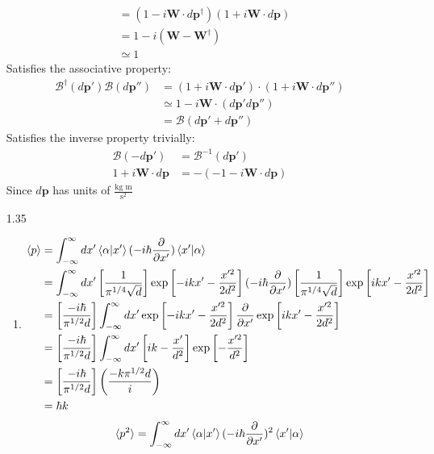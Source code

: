 \documentclass[12pt]{article}
\newcommand{\opp}{\pmb{\text{p}}}
\newcommand{\boostdag}{\mathscr{B}^{\dag}(d\opp')}
\newcommand{\opw}{\pmb{\text{W}}}
\newcommand{\p}[2]{\frac{\partial #1}{\partial #2}}
\begin{document}
\begin{enumerate}
\begin{align*}
            &=(1-i\opw\cdot d\opp^{\dagger})(1+i\opw\cdot d\opp)\\
            &=1-i(\opw-\opw^{\dagger})\\
            &\simeq 1
        \end{align*}
        Satisfies the associative property:
        \begin{align*}
            \boostdag\mathscr{B}(d\opp'')&=(1+i\opw\cdot d\opp')\cdot(1+i\opw\cdot d\opp'')\\
            &\simeq 1-i\opw\cdot(d\opp' d\opp'')\\
            &= \mathscr{B}(d\opp'+d\opp'')
        \end{align*}
        Satisfies the inverse property trivially:
        \begin{align*}
            \mathscr{B}(-d\opp')&=\mathscr{B}^{-1}(d\opp')\\
            1+i\opw\cdot d\opp&=-(-1-i\opw\cdot d\opp)
        \end{align*}
        Since $d\opp$ has units of $\frac{\text{kg m}}{\text{s}^2}$
        \item[1.35]
        \begin{enumerate}
            \item
            \begin{align*}
                \braket{p}&=\int_{-\infty}^{\infty}dx'\braket{\alpha|x'}(-i\hbar\p{}{x'})\braket{x'|\alpha}\\
                &=\int_{-\infty}^{\infty}dx'\left[\frac{1}{\pi^{1/4}\sqrt{d}}\right]\exp\left[-ikx'-\frac{x'^2}{2d^2}\right](-i\hbar\p{}{x'})\left[\frac{1}{\pi^{1/4}\sqrt{d}}\right]\exp\left[ikx'-\frac{x'^2}{2d^2}\right]\\
                &=\left[\frac{-i\hbar}{\pi^{1/2}d}\right]\int_{-\infty}^{\infty}dx'\exp\left[-ikx'-\frac{x'^2}{2d^2}\right]\p{}{x'}\exp\left[ikx'-\frac{x'^2}{2d^2}\right]\\
                &=\left[\frac{-i\hbar}{\pi^{1/2}d}\right]\int_{-\infty}^{\infty}dx'\left[ ik-\frac{x'}{d^2} \right]\exp\left[-\frac{x'^2}{d^2}\right]\\
                &=\left[\frac{-i\hbar}{\pi^{1/2}d}\right]\left(\frac{-k\pi^{1/2}d}{i}\right)\\
                &=\hbar k
            \end{align*}
            \begin{align*}
                \braket{p^2}&=\int_{-\infty}^{\infty}dx'\braket{\alpha|x'}(-i\hbar\p{}{x'})^2\braket{x'|\alpha}\\

\end{align*}
\end{enumerate}
\end{enumerate}
\end{document}
